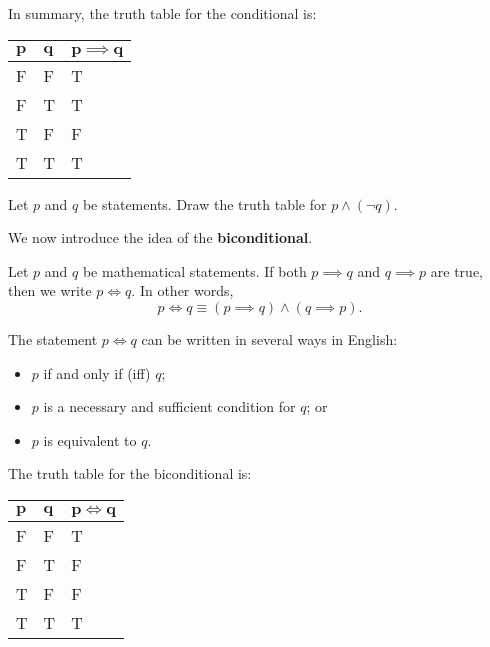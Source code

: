 In summary, the truth table for the conditional is:
\begin{table}[h]
    \centering
    \begin{tabular}{|l|l||l|}
        \hline
        $\boldsymbol{p}$ & $\boldsymbol{q}$ & $\boldsymbol{p\implies q}$ \\ \hline
        F   & F   & T             \\ \hline
        F   & T   & T             \\ \hline
        T   & F   & F             \\ \hline
        T   & T   & T             \\ \hline
    \end{tabular}
\end{table}

\begin{exercise}\label{exercise-negation-of-implication}
    Let $p$ and $q$ be statements. Draw the truth table for $p \land (\lnot q)$.
\end{exercise}

We now introduce the idea of the \textbf{biconditional}.
\begin{definition}
    Let $p$ and $q$ be mathematical statements. If both $p \implies q$ and $q \implies p$ are true, then we write $p \iff q$. In other words,
    \[
        p \iff q \equiv (p \implies q) \land (q \implies p).
    \]
\end{definition}
\begin{remark}
    The statement $p \iff q$ can be written in several ways in English:
    \begin{itemize}
        \item $p$ if and only if (iff) $q$;
        \item $p$ is a necessary and sufficient condition for $q$; or
        \item $p$ is equivalent to $q$.
    \end{itemize}
\end{remark}

The truth table for the biconditional is:
\begin{table}[h]
    \centering
    \begin{tabular}{|l|l||l|}
        \hline
        $\boldsymbol{p}$ & $\boldsymbol{q}$ & $\boldsymbol{p \iff q}$ \\ \hline
        F   & F   & T         \\ \hline
        F   & T   & F         \\ \hline
        T   & F   & F         \\ \hline
        T   & T   & T         \\ \hline
    \end{tabular}
\end{table}

